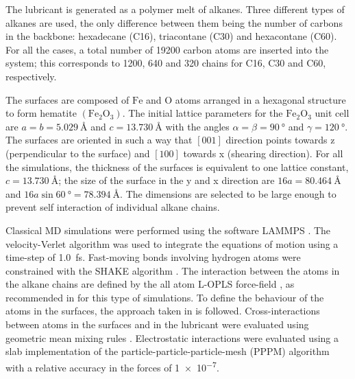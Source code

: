 \documentclass[aps,prb,reprint,superscriptaddress, a4paper]{revtex4-1}
\begin{document}
The lubricant is generated as a polymer melt of alkanes. Three different types of alkanes are used, the only difference between them being the number of carbons in the backbone:  hexadecane (C16),  triacontane (C30) and  hexacontane (C60). For all the cases, a  total number of 19200 carbon atoms    are inserted into the system; this corresponds to 1200, 640 and 320 chains for C16, C30 and C60, respectively.

The surfaces are composed of $\text{Fe}$ and $\text{O}$ atoms arranged in a hexagonal structure to form hematite $\left(\text{Fe}_2\text{O}_3\right)$. The initial lattice parameters for the $\text{Fe}_2\text{O}_3$ unit cell are $a=b=\SI{5.029}{\angstrom}$ and  $c=\SI{13.730}{\angstrom}$ with the angles $\alpha=\beta=\SI{90}{\degree}$ and  $\gamma=\SI{120}{\degree}$. The surfaces are oriented in such a way that   $\left[001\right]$ direction points towards z (perpendicular to the surface) and  $\left[100\right]$ towards x (shearing direction). For all the simulations, the thickness of the surfaces is equivalent to one lattice constant, $c=\SI{13.730}{\angstrom}$; the size of the surface in the  y and x direction are $16a=\SI{80.464}{\angstrom}$ and $16a\sin{\SI{60}{\degree}}=\SI{78.394}{\angstrom}$. The dimensions are selected to be large enough to prevent self interaction of individual alkane chains.


Classical MD simulations were performed using the software LAMMPS \cite{Plimpton1995}. The velocity-Verlet algorithm was used to integrate the equations of motion using a  time-step of \SI{1.0}{\femto\second}. Fast-moving bonds involving hydrogen atoms were constrained with the SHAKE algorithm \cite{Ryckaert1977}. The interaction between the atoms in the alkane chains are defined by the all atom L-OPLS force-field \cite{Jorgensen1988,Siu2012}, as recommended in \cite{Ewen2016a} for this type of simulations. To define the behaviour of the atoms in the surfaces, the approach taken in \cite{Savio2012} is followed.  Cross-interactions between atoms in the surfaces and in the lubricant were evaluated using  geometric mean mixing rules \cite{Jorgensen1996}. Electrostatic interactions were evaluated using a slab implementation of the particle-particle-particle-mesh (PPPM) algorithm \cite{Yeh1999} with a relative accuracy in the forces of \SI{1e-7}{}. 
\end{document}
